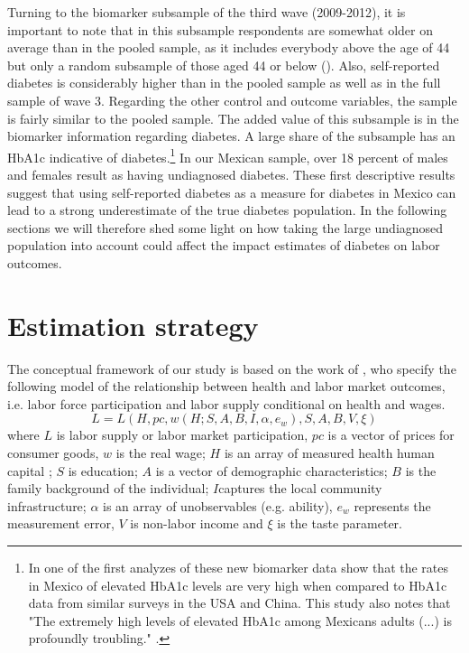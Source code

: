 \documentclass[12pt,english,british]{article}
\begin{document}
Turning to the biomarker subsample of the third wave (2009-2012), it is important to note that in this subsample respondents are somewhat older on average than in the pooled sample, as it includes everybody above the age of 44 but only a random subsample of those aged 44 or below (\cite{Crimmins2015}). Also, self-reported diabetes is considerably higher than in the pooled sample as well as in the full sample of wave 3. Regarding the other control and outcome variables, the sample is fairly similar to the pooled sample. The added value of this subsample is in the biomarker information regarding diabetes. A large share of the subsample has an \ac{HbA1c} indicative of diabetes.\footnote{In one of the first analyzes of these new biomarker data \citet{Frankenberg2015} show that the rates in Mexico of elevated \ac{HbA1c} levels are very high when compared to \ac{HbA1c} data from similar surveys in the \ac{USA} and China. This study also notes that "The extremely high levels of elevated \ac{HbA1c} among Mexicans adults (...) is profoundly troubling." \citep[p.18]{Frankenberg2015}.} In our Mexican sample, over 18 percent of males and females result as having undiagnosed diabetes. These first descriptive results suggest that using self-reported diabetes as a measure for diabetes in Mexico can lead to a strong underestimate of the true diabetes population. In the following sections we will therefore shed some light on how taking the large undiagnosed population into account could affect the impact estimates of diabetes on labor outcomes. 

\section{\label{sec:Estimation Strategy}Estimation strategy}

  
The conceptual framework of our study is based on the work of \citet{Strauss1998}, who specify the following model of the relationship between health and labor market outcomes, i.e. labor force participation and labor supply conditional on health and wages.
\begin{equation}
L=L(H, pc, w(H;S,A,B,I,\alpha,e_{w}), S, A, B, V, \xi) \label{eq:wage}
\end{equation}
where $L$ is labor supply or labor market participation, $pc $ is a vector of prices for consumer goods, $w$ is the real wage; $H$ is an array of measured health human capital ; $S$ is education; $A$ is a vector of demographic characteristics; $B$ is the family background of the individual; $I$captures the local community infrastructure; $\alpha$ is an array of unobservables (e.g. ability), $e_w$ represents the measurement error, $V$ is non-labor income and $\xi$ is the taste parameter. 
\end{document}
